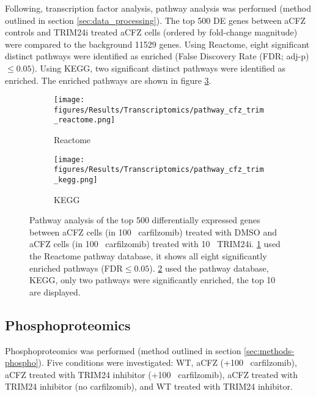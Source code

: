 
Following, transcription factor analysis, pathway analysis was performed (method outlined in section \ref{sec:data_processing}).
The top 500 DE genes between aCFZ controls and TRIM24i treated aCFZ cells (ordered by fold-change magnitude) were compared to the background 11529 genes.
Using Reactome, eight significant distinct pathways were identified as enriched (False Discovery Rate (FDR; adj-p) $\leq0.05$).
Using KEGG, two significant distinct pathways were identified as enriched.
The enriched pathways are shown in figure \ref{fig:pathway_cfz_trim_barplots}.

\begin{figure}[htb]
\begin{subfigure}[t]{0.5\textwidth}
    \texttt{[image: figures/Results/Transcriptomics/pathway\_cfz\_trim\_reactome.png]}
    \caption{Reactome}
    \label{fig:pathway_barplot_cfz_trim_reactome}
\end{subfigure}
%
\begin{subfigure}[t]{0.5\textwidth}
    \texttt{[image: figures/Results/Transcriptomics/pathway\_cfz\_trim\_kegg.png]}
    \caption{KEGG}
    \label{fig:pathway_barplot_cfz_trim_kegg}
\end{subfigure}
    \caption[aCFZ TRIM24i pathway analysis barplots]{Pathway analysis of the top 500 differentially expressed genes between aCFZ cells (in 100\si{\nano\Molar} carfilzomib) treated with DMSO and aCFZ cells (in 100\si{\nano\Molar} carfilzomib) treated with 10\si{\micro\Molar} TRIM24i. \ref{fig:pathway_barplot_cfz_trim_reactome} used the Reactome pathway database, it shows all eight significantly enriched pathways (FDR$\leq0.05$). \ref{fig:pathway_barplot_cfz_trim_kegg} used the pathway database, KEGG, only two pathways were significantly enriched, the top 10 are displayed.}
\label{fig:pathway_cfz_trim_barplots}
\end{figure}


\subsection{Phosphoproteomics}\label{subsec:omics-phospho}
Phosphoproteomics was performed (method outlined in section \ref{sec:methods-phospho}).
Five conditions were investigated: WT, aCFZ (+100\si{\nano\Molar} carfilzomib), aCFZ treated with TRIM24 inhibitor (+100\si{\nano\Molar} carfilzomib), aCFZ treated with TRIM24 inhibitor (no carfilzomib), and WT treated with TRIM24 inhibitor.

